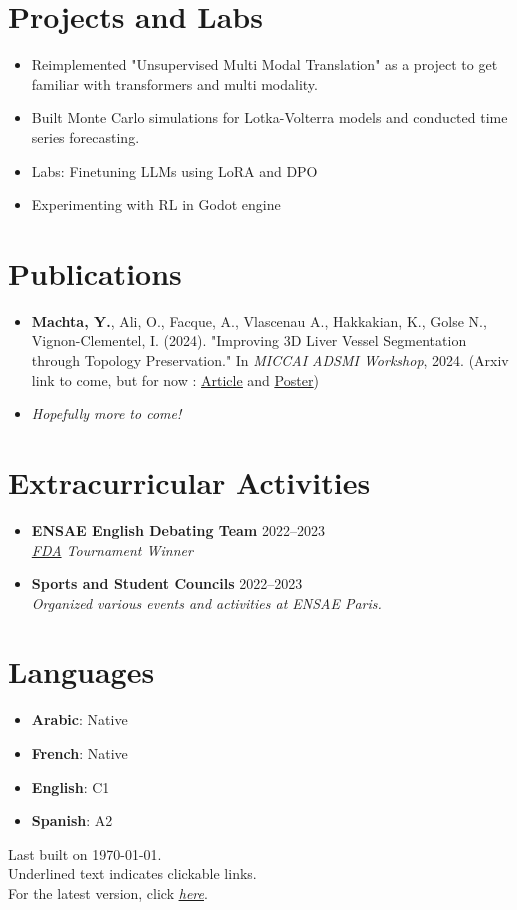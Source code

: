\documentclass[letterpaper,11pt,twocolumn]{article}
\newcommand{\resumeItem}[1]{\item \small{#1}}
\newcommand{\resumeSubheading}[4]{
  \vspace{-2pt}\item \textbf{#1} \hfill #2 \\
  \textit{\small #3} \hfill \textit{\small #4} 
  \vspace{-7pt}
}
\begin{document}
\section{Projects and Labs}
\begin{itemize}[leftmargin=*]
  \resumeItem{Reimplemented "Unsupervised Multi Modal Translation" as a project to get familiar with transformers and multi modality.}
  \resumeItem{Built Monte Carlo simulations for Lotka-Volterra models and conducted time series forecasting.}
  \resumeItem{Labs: Finetuning LLMs using LoRA and DPO }
  \resumeItem{Experimenting with RL in Godot engine }
\end{itemize}

\section{Publications}
\begin{itemize}[leftmargin=*]
  \resumeItem{\textbf{Machta, Y.}, Ali, O., Facque, A., Vlascenau A., Hakkakian, K., Golse N., Vignon-Clementel, I. (2024). "Improving 3D Liver Vessel Segmentation through Topology Preservation." In \textit{MICCAI ADSMI Workshop}, 2024. (Arxiv link to come, but for now : \href{https://MachtaYassine.github.io/Papers/2024_ADSMI.pdf}{\underline{Article}} and \href{https://MachtaYassine.github.io/Papers/2024_ADSMI_poster.pdf}{\underline{Poster}})}
  \resumeItem{\textit{Hopefully more to come!}}
\end{itemize}

\section{Extracurricular Activities}
\begin{itemize}[leftmargin=*]
  \resumeSubheading
    {ENSAE English Debating Team}{2022--2023}{\href{https://www.frenchdebatingassociation.fr/#fda}{FDA} Tournament Winner}{}
  \resumeSubheading
    {Sports and Student Councils}{2022--2023}{Organized various events and activities at ENSAE Paris.}{}
\end{itemize}

\section{Languages}
\begin{itemize}[leftmargin=*]
  \item \textbf{Arabic}: Native
  \item \textbf{French}: Native
  \item \textbf{English}: C1
  \item \textbf{Spanish}: A2
\end{itemize}

\begin{flushright}
  \vspace{-4pt}
  \color{gray}
  Last built on \today.  \\
  Underlined text indicates clickable links. \\
  For the latest version, click \href{https://machtayassine.github.io/resume/resume_ymachta.pdf}{\underline{\textit{here}}}.
\end{flushright}
\end{document}
